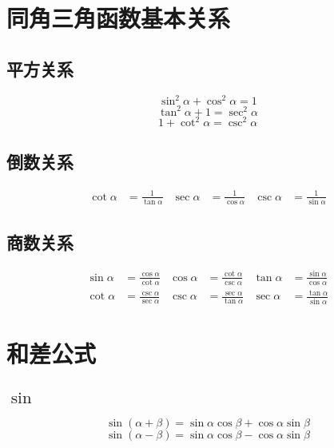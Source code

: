 \documentclass[a4paper, fleqn, fontset = mac]{ctexart}
\newcommand{\diform}{\noindent}
\begin{document}
\begin{multicols}{2}
\begin{multicols}{2}[\setlength{\columnseprule}{0pt}\setlength{\columnseprule}{0pt}]
		\end{multicols}
	
		\section{同角三角函数基本关系}
	
		\subsection{平方关系}
		\diform
		\[\sin^2\alpha+\cos^2\alpha=1\]
		\[\tan^2\alpha+1=\sec^2\alpha\]
		\[1+\cot^2\alpha=\csc^2\alpha\]
	
		\subsection{倒数关系}
		\diform
		
		
		\begin{align*}
		\cot\alpha&=\frac1{\tan\alpha} &
		\sec\alpha&=\frac1{\cos\alpha} &
		\csc\alpha&=\frac1{\sin\alpha} 
		\end{align*}
	
		\subsection{商数关系}
		\diform
		\begin{align*}
			\sin\alpha&=\frac{\cos\alpha}{\cot\alpha} &
			\cos\alpha&=\frac{\cot\alpha}{\csc\alpha} &
			\tan\alpha&=\frac{\sin\alpha}{\cos\alpha} \\
			\cot\alpha&=\frac{\csc\alpha}{\sec\alpha} &
			\csc\alpha&=\frac{\sec\alpha}{\tan\alpha} &
			\sec\alpha&=\frac{\tan\alpha}{\sin\alpha} 
		\end{align*}
	
		\section{和差公式}
		\subsection{$\sin$}
		\diform
		\[ \sin\left( \alpha+\beta \right) 
		= \sin\alpha\cos\beta + \cos\alpha\sin\beta \]
		\[ \sin\left( \alpha-\beta \right) 
		= \sin\alpha\cos\beta - \cos\alpha\sin\beta \]
		

\end{multicols}
\end{document}
